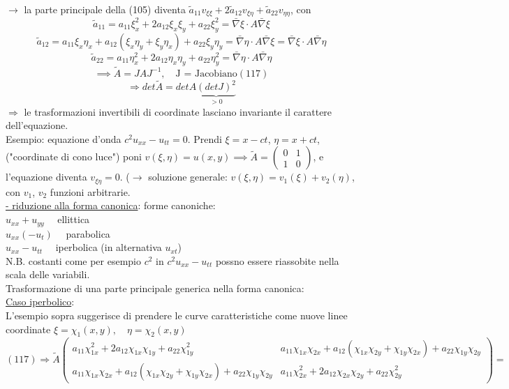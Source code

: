 \documentclass[a4paper,11pt]{report}
\begin{document}
$\rightarrow$ la parte principale della (105) diventa $ \tilde{a}_{11} v_{\xi\xi} + 2 \tilde{a}_{12}v_{\xi\eta} + \tilde{a}_{22}v_{\eta\eta}$, con 
$$
\tilde{a}_{11}= a_11 \xi_x^2 + 2a_{12}\xi_x\xi_y + a_{22} \xi_y^2 = \bar{\nabla}\xi \cdot A\bar{\nabla}\xi
$$
$$
\tilde{a}_{12}= a_11 \xi_x\eta_x + a_{12}(\xi_x\eta_y+\xi_y\eta_x) + a_{22} \xi_y\eta_y = \bar{\nabla}\eta \cdot A\bar{\nabla}\xi = \bar{\nabla}\xi \cdot A\bar{\nabla}\eta
$$
$$
\tilde{a}_{22}= a_11 \eta_x^2 + 2a_{12}\eta_x\eta_y + a_{22} \eta_y^2 = \bar{\nabla}\eta \cdot A\bar{\nabla}\eta
$$
\begin{equation}
\implies \tilde{A} = J A J^{-1}, \quad \text{J = Jacobiano} (117)
\end{equation}
$$
\Rightarrow det \tilde{A} = det A\underset{>0}{\underbrace{(det J)^2}}
$$
$\Rightarrow$ le trasformazioni invertibili di coordinate lasciano invariante il carattere dell'equazione.\\
Esempio: equazione d'onda $c^2u_{xx} - u_{tt}=0$. Prendi $\xi=x-ct$, $\eta = x+ct$, ("coordinate di cono luce")  poni $v(\xi,\eta) = u(x,y) \implies \tilde{A}=\left(\begin{matrix}
0 & 1\\
1 & 0
\end{matrix}\right)$, e l'equazione diventa $v_{\xi\eta}=0$. ($\rightarrow$ soluzione generale: $v(\xi,\eta)=v_1(\xi) + v_2(\eta)$, con $v_1$, $v_2$ funzioni arbitrarie.\\
\underline{- riduzione alla forma canonica}:
forme canoniche:\\
$u_{xx} + u_{yy} \quad$ ellittica\\
$u_{xx} (- u_t) \quad$ parabolica\\
$u_{xx} - u_{tt} \quad$ iperbolica (in alternativa $u_{xt}$)\\
N.B. costanti come per esempio $c^2$ in $c^2 u_{xx}-u_{tt}$ possno essere riassobite nella scala delle variabili.\\
Trasformazione di una parte principale generica nella forma canonica:\\
\underline{Caso iperbolico}:\\
L'esempio sopra suggerisce di prendere le curve caratteristiche come nuove linee coordinate $\xi=\chi_1(x,y),\quad \eta=\chi_2(x,y)$
$$
(117)\Rightarrow \tilde{A}\left(\begin{matrix}
a_{11}\chi_{1x}^2 + 2a_{12}\chi_{1x}\chi_{1y} + a_{22}\chi_{1y}^2  & a_{11}\chi_{1x}\chi_{2x} + a_{12}(\chi_{1x}\chi_{2y} + \chi_{1y}\chi_{2x}) + a_{22}\chi_{1y}\chi_{2y} \\
a_{11}\chi_{1x}\chi_{2x} + a_{12}(\chi_{1x}\chi_{2y} + \chi_{1y}\chi_{2x}) + a_{22}\chi_{1y}\chi_{2y}  & a_{11}\chi_{2x}^2 + 2a_{12}\chi_{2x}\chi_{2y} + a_{22}\chi_{2y}^2
\end{matrix} \right)=
$$
\end{document}
